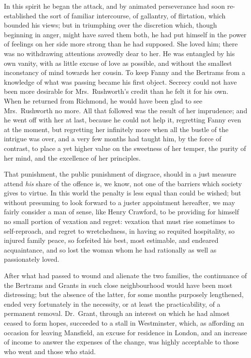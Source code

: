 In this spirit he began the attack, and by animated
perseverance had soon re-established the sort of familiar
intercourse, of gallantry, of flirtation, which bounded
his views; but in triumphing over the discretion which,
though beginning in anger, might have saved them both,
he had put himself in the power of feelings on her side
more strong than he had supposed.  She loved him;
there was no withdrawing attentions avowedly dear to her.
He was entangled by his own vanity, with as little
excuse of love as possible, and without the smallest
inconstancy of mind towards her cousin.  To keep Fanny
and the Bertrams from a knowledge of what was passing
became his first object.  Secrecy could not have been
more desirable for Mrs.\ Rushworth's credit than he
felt it for his own.  When he returned from Richmond,
he would have been glad to see Mrs.\ Rushworth no more.
All that followed was the result of her imprudence;
and he went off with her at last, because he could
not help it, regretting Fanny even at the moment,
but regretting her infinitely more when all the bustle of
the intrigue was over, and a very few months had taught him,
by the force of contrast, to place a yet higher value
on the sweetness of her temper, the purity of her mind,
and the excellence of her principles.

That punishment, the public punishment of disgrace,
should in a just measure attend \emph{his} share of the offence is,
we know, not one of the barriers which society gives
to virtue.  In this world the penalty is less equal than
could be wished; but without presuming to look forward
to a juster appointment hereafter, we may fairly consider
a man of sense, like Henry Crawford, to be providing
for himself no small portion of vexation and regret:
vexation that must rise sometimes to self-reproach, and
regret to wretchedness, in having so requited hospitality,
so injured family peace, so forfeited his best, most estimable,
and endeared acquaintance, and so lost the woman whom
he had rationally as well as passionately loved.

After what had passed to wound and alienate the two families,
the continuance of the Bertrams and Grants in such
close neighbourhood would have been most distressing;
but the absence of the latter, for some months purposely
lengthened, ended very fortunately in the necessity,
or at least the practicability, of a permanent removal.
Dr.\ Grant, through an interest on which he had almost
ceased to form hopes, succeeded to a stall in Westminster,
which, as affording an occasion for leaving Mansfield,
an excuse for residence in London, and an increase of
income to answer the expenses of the change, was highly
acceptable to those who went and those who staid.

